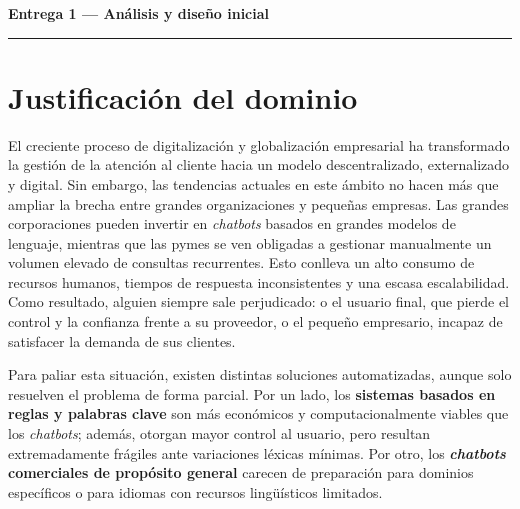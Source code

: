 \documentclass[11pt,a4paper,twoside]{article}
\theoremstyle{definition}
\numberwithin{equation}{section}
\begin{document}
\makeatletter
\renewcommand*\l@section[2]{%
	\addpenalty{-\@highpenalty}%
	\addvspace{1.0em \@plus\p@}%
	\setlength\@tempdima{2.0em}%
	\begingroup
	\parindent\z@ \rightskip\@pnumwidth
	\parfillskip-\@pnumwidth
	\leavevmode \bfseries
	\advance\leftskip\@tempdima
	\hskip-\leftskip
	#1\nobreak\hfil\nobreak
	\hb@xt@\@pnumwidth{\hss#2}\par
	\penalty\@highpenalty
	\endgroup}
\makeatother

{
\vspace{6pt}
\normalsize
\tableofcontents
}

\newpage


\begin{Large}
	\noindent \textbf{Entrega 1 --- Análisis y diseño inicial}
\end{Large}

\vspace{0.5pt}
\noindent \rule{\textwidth}{1pt}


\section{Justificación del dominio}
El creciente proceso de digitalización y globalización empresarial ha transformado la gestión de la atención al cliente hacia un modelo descentralizado, externalizado y digital. Sin embargo, las tendencias actuales en este ámbito no hacen más que ampliar la brecha entre grandes organizaciones y pequeñas empresas. Las grandes corporaciones pueden invertir en \textit{chatbots} basados en grandes modelos de lenguaje, mientras que las pymes se ven obligadas a gestionar manualmente un volumen elevado de consultas recurrentes. Esto conlleva un alto consumo de recursos humanos, tiempos de respuesta inconsistentes y una escasa escalabilidad. Como resultado, alguien siempre sale perjudicado: o el usuario final, que pierde el control y la confianza frente a su proveedor, o el pequeño empresario, incapaz de satisfacer la demanda de sus clientes.

Para paliar esta situación, existen distintas soluciones automatizadas, aunque solo resuelven el problema de forma parcial. Por un lado, los \textbf{sistemas basados en reglas y palabras clave} son más económicos y computacionalmente viables que los \textit{chatbots}; además, otorgan mayor control al usuario, pero resultan extremadamente frágiles ante variaciones léxicas mínimas. Por otro, los \textbf{\textit{chatbots} comerciales de propósito general} carecen de preparación para dominios específicos o para idiomas con recursos lingüísticos limitados.
\end{document}
